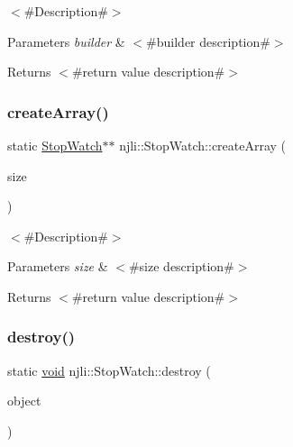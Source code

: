 $<$\#\+Description\#$>$


\begin{DoxyParams}{Parameters}
{\em builder} & $<$\#builder description\#$>$\\
\hline
\end{DoxyParams}
\begin{DoxyReturn}{Returns}
$<$\#return value description\#$>$ 
\end{DoxyReturn}
\mbox{\label{classnjli_1_1_stop_watch_ab3ca2ba06be2e649b3d68e3582a24606}} 
\subsubsection{\texorpdfstring{create\+Array()}{createArray()}}
{\footnotesize\ttfamily static \mbox{\hyperlink{classnjli_1_1_stop_watch}{Stop\+Watch}}$\ast$$\ast$ njli\+::\+Stop\+Watch\+::create\+Array (\begin{DoxyParamCaption}\item[{const \mbox{\hyperlink{_util_8h_a10e94b422ef0c20dcdec20d31a1f5049}{u32}}}]{size }\end{DoxyParamCaption})\hspace{0.3cm}{\ttfamily [static]}}

$<$\#\+Description\#$>$


\begin{DoxyParams}{Parameters}
{\em size} & $<$\#size description\#$>$\\
\hline
\end{DoxyParams}
\begin{DoxyReturn}{Returns}
$<$\#return value description\#$>$ 
\end{DoxyReturn}
\mbox{\label{classnjli_1_1_stop_watch_aebb1a654fc268b038e1f48649e796fd7}} 
\subsubsection{\texorpdfstring{destroy()}{destroy()}}
{\footnotesize\ttfamily static \mbox{\hyperlink{_thread_8h_af1e856da2e658414cb2456cb6f7ebc66}{void}} njli\+::\+Stop\+Watch\+::destroy (\begin{DoxyParamCaption}\item[{\mbox{\hyperlink{classnjli_1_1_stop_watch}{Stop\+Watch}} $\ast$}]{object }\end{DoxyParamCaption})\hspace{0.3cm}{\ttfamily [static]}}

